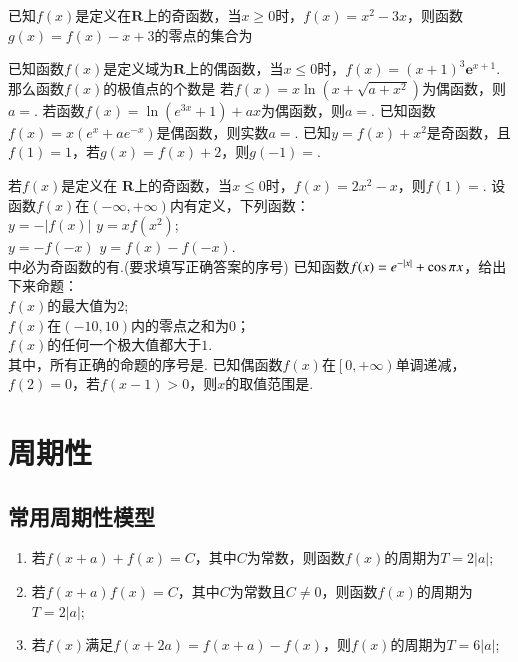 \documentclass{BHCexam}
\begin{document}
\begin{questions}
\qs 已知$f(x)$是定义在$ \mathbf{R} $上的奇函数，当$ x\ge 0 $时，$f(x)=x^2-3x$，则函数$ g(x)=f(x)-x+3 $的零点的集合为\xx
{}


\qs 已知函数$f(x)$是定义域为$ \mathbf{R} $上的偶函数，当$ x\le0 $时，$f(x)=\left(x+1\right)^3\bm{e}^{x+1}$.那么函数$f(x)$的极值点的个数是\xx
{}
\qs 若$f(x)=x\ln (x+\sqrt{a+x^2})$为偶函数，则$ a= $\tk.
\qs 若函数$f(x)=\ln (e^{3x}+1)+ax$为偶函数，则$ a= $\tk.
\qs 已知函数$f(x)=x\left(e^x+ae^{-x}\right)$是偶函数，则实数$ a= $\tk.
\qs 已知$y=f(x)+x^2$是奇函数，且$f(1)=1$，若$g(x)=f(x)+2$，则$ g(-1)= $\tk.

\qs 若$f(x)$是定义在 $\mathbf{R} $上的奇函数，当$ x\le0 $时，$f(x)=2x^2-x$，则$f(1)=$\tk.
\qs 设函数$f(x)$在$ \left(-\infty,+\infty\right) $内有定义，下列函数：\\
 $ y=-\left|f(x)\right| $\qquad{} $ y=xf(x^2) $;\\
 $ y=-f(-x) $\qquad {} $ y=f(x)-f(-x) $.\\
中必为奇函数的有\tk.(要求填写正确答案的序号)
\qs 已知函数$f(x)=e^{-\left| x \right|}+\cos \pi x$，给出下来命题：\\
 $f(x)$的最大值为$2$;\\
 $f(x)$在$ \left(-10,10\right) $内的零点之和为$ 0 $；\\
 $f(x)$的任何一个极大值都大于$ 1 $.\\
其中，所有正确的命题的序号是\tk.
\qs 已知偶函数$f(x)$在$ \left[0,+\infty\right) $单调递减，$ f(2)=0 $，若$f(x-1)>0$，则$ x $的取值范围是\tk.
\end{questions}
\newpage


\section{周期性}
\subsection{常用周期性模型}
\begin{enumerate}[1)]
\item 若$ f(x+a)+f(x)=C $，其中$ C $为常数，则函数$f(x)$的周期为$ T=2\left|a\right|$;
\item 若$ f(x+a)f(x)=C $，其中$ C $为常数且$ C\ne 0 $，则函数$f(x)$的周期为$ T=2\left|a\right|$;
\item 若$f(x)$满足$ f(x+2a)=f(x+a)-f(x) $，则$f(x)$的周期为$ T=6\left|a\right| $;
\end{enumerate}
\end{document}
